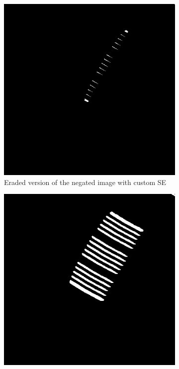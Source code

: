 \documentclass[a4paper]{article}
\begin{document}
\begin{figure}[htp]
\centering
\begin{subfigure}{.33\textwidth}
  \centering
  \includegraphics[width=.9\linewidth]{ex4.2-erosion}
  \caption{Eraded version of the negated image with custom SE}
  \label{fig:sub1}
\end{subfigure}%
\begin{subfigure}{.33\textwidth}
  \centering
  \includegraphics[width=.9\linewidth]{ex4.3-opening}

\end{subfigure}
\end{figure}
\end{document}
